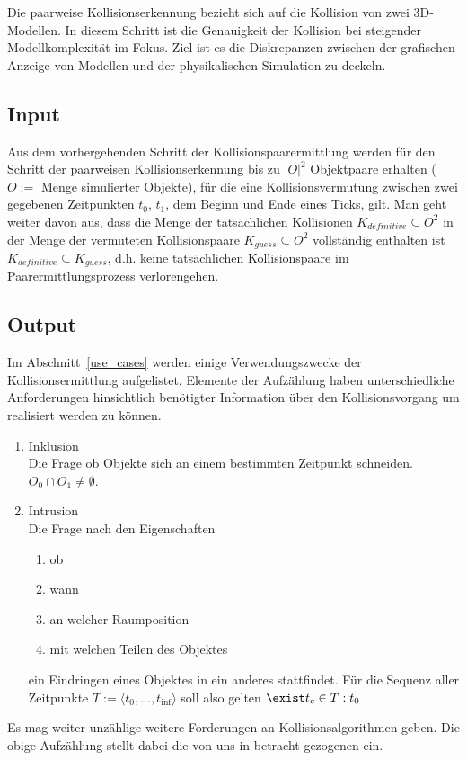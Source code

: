 Die paarweise Kollisionserkennung bezieht sich auf die Kollision von zwei 3D-Modellen. In diesem Schritt ist die Genauigkeit der Kollision bei steigender Modellkomplexität im Fokus.
Ziel ist es die Diskrepanzen zwischen der grafischen Anzeige von Modellen und der physikalischen Simulation zu deckeln.
\subsection{Input}
Aus dem vorhergehenden Schritt der Kollisionspaarermittlung werden für den Schritt der paarweisen Kollisionserkennung bis zu  $|O|^2$ Objektpaare erhalten ($O :=$ Menge simulierter Objekte), für die eine Kollisionsvermutung zwischen zwei gegebenen Zeitpunkten $t_0$, $t_1$, dem Beginn und Ende eines Ticks, gilt. Man geht weiter davon aus, dass die Menge der tatsächlichen Kollisionen $K_{definitive}\subseteq O^2$ in der Menge der vermuteten Kollisionspaare $K_{guess}\subseteq O^2$  vollständig enthalten ist $K_{definitive}\subseteq K_{guess}$, d.h. keine tatsächlichen Kollisionspaare im Paarermittlungsprozess verlorengehen.

\subsection{Output}
Im Abschnitt~\ref{use_cases} werden einige Verwendungszwecke der Kollisionsermittlung aufgelistet. 
Elemente der Aufzählung haben unterschiedliche Anforderungen hinsichtlich benötigter Information über den Kollisionsvorgang um realisiert werden zu können.

\begin{enumerate}
	\item Inklusion\\
		Die Frage ob Objekte sich an einem bestimmten Zeitpunkt schneiden. $O_0 \cap O_1 \neq \emptyset$.
	\item Intrusion\\
		Die Frage nach den Eigenschaften
		\begin{enumerate}
		\item ob
		\item wann
		\item an welcher Raumposition
		\item mit welchen Teilen des Objektes
		\end{enumerate}
		ein Eindringen eines Objektes in ein anderes stattfindet. 
		Für die Sequenz aller Zeitpunkte $T:=\langle t_0, ... , t_\inf\rangle$ soll also gelten $\exist t_c\in T : {t_0}$
\end{enumerate}
Es mag weiter unzählige weitere Forderungen an Kollisionsalgorithmen geben. Die obige Aufzählung stellt dabei die von uns in betracht gezogenen ein.

